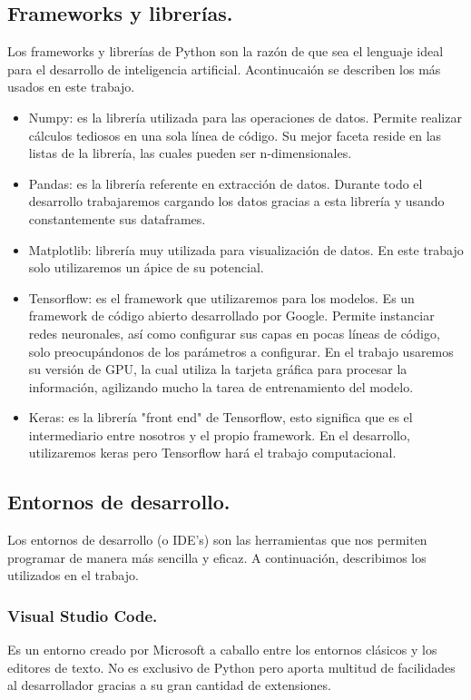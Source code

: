 \documentclass[a4paper,10pt]{article}
\begin{document}
\subsection{Frameworks y librerías.}
Los frameworks y librerías de Python son la razón de que sea el lenguaje ideal para el desarrollo de inteligencia artificial. Acontinucaión se describen los más usados en este trabajo.
\begin{itemize}
\item Numpy: es la librería utilizada para las operaciones de datos. Permite realizar cálculos tediosos en una sola línea de código. Su mejor faceta reside en las listas de la librería, las cuales pueden ser n-dimensionales.
\item Pandas: es la librería referente en extracción de datos. Durante todo el desarrollo trabajaremos cargando los datos gracias a esta librería y usando constantemente sus dataframes.
\item Matplotlib: librería muy utilizada para visualización de datos. En este trabajo solo utilizaremos un ápice de su potencial.
\item Tensorflow: es el framework que utilizaremos para los modelos. Es un framework de código abierto desarrollado por Google. Permite instanciar redes neuronales, así como configurar sus capas en pocas líneas de código, solo preocupándonos de los parámetros a configurar. En el trabajo usaremos su versión de GPU, la cual utiliza la tarjeta gráfica para procesar la información, agilizando mucho la tarea de entrenamiento del modelo.
\item Keras: es la librería "front end"  de Tensorflow, esto significa que es el intermediario entre nosotros y el propio framework. En el desarrollo, utilizaremos keras pero Tensorflow hará el trabajo  computacional.
\end{itemize}

\subsection{Entornos de desarrollo.}
Los entornos de desarrollo (o IDE's) son las herramientas que nos permiten programar de manera más sencilla y eficaz. A continuación, describimos los utilizados en el trabajo.
\subsubsection{Visual Studio Code.}
Es un entorno creado por Microsoft a caballo entre los entornos clásicos y los editores de texto. No es exclusivo de Python pero aporta multitud de facilidades al desarrollador gracias a su gran cantidad de extensiones.
\end{document}
